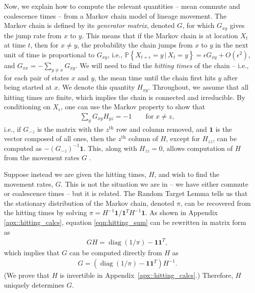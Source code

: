 \documentclass{article}
\DeclareMathOperator{\diag}{\mathop{\mbox{diag}}}
\renewcommand{\P}{\mathbb{P}}
\newcommand{\given}{\,\vert\,}
\newcommand{\PP}[1]{\P\!\left\{#1\right\}}
\newcommand{\bone}{\mathbf{1}}
\begin{document}
Now, we explain how to compute the relevant quantities --
mean commute and coalescence times -- from a Markov chain model of lineage movement.
The Markov chain is defined by its \emph{generator matrix}, denoted $G$,
for which $G_{xy}$ gives the jump rate from $x$ to $y$.
This means that if the Markov chain is at location $X_t$ at time $t$,
then for $x \neq y$, the probability the chain jumps from $x$ to $y$ in the next unit of time
is proportional to $G_{xy}$,
i.e., $\PP{X_{t+\epsilon} = y \given X_t = y} = \epsilon G_{xy} + O(\epsilon^2)$,
and $G_{xx} = - \sum_{y \neq x} G_{xy}$.
We will need to find the \emph{hitting times} of the chain --
i.e., for each pair of states $x$ and $y$, 
the mean time until the chain first hits $y$ after being started at $x$.
We denote this quantity $H_{xy}$.
Throughout, we assume that all hitting times are finite,
which implies the chain is connected and irreducible.
By conditioning on $X_\epsilon$,
one can use the Markov property to show that
\begin{align} \label{eqn:hitting_sum}
    \sum_y G_{xy} H_{yz} = -1 \qquad \text{for} \; x \neq z,
\end{align}
i.e., if $G_{-z}$ is the matrix with the $z^\text{th}$ row and column removed,
and $\bone$ is the vector composed of all ones,
then the $z^\text{th}$ column of $H$, except for $H_{zz}$,
can be computed as $- (G_{-z})^{-1} \bone$.
This, along with $H_{zz} = 0$, allows computation of $H$
from the movement rates $G$ \citep{kemeny1983finite}.

Suppose instead we are given the hitting times, $H$, and wish to find the movement rates, $G$.
This is not the situation we are in -- we have either commute or coalescence times --
but it is related.
The Random Target Lemma \citep{aldous-fill-2014}
tells us that the stationary distribution of the Markov chain, denoted $\pi$,
can be recovered from the hitting times by solving $\pi = H^{-1} \bone / \bone^T H^{-1} \bone$.
As shown in Appendix \ref{apx::hitting_calcs},
equation \eqref{eqn:hitting_sum} can be rewritten in matrix form as
\begin{align}
    G H = \diag(1/\pi) - \bone \bone^T ,
\end{align}
which implies that $G$ can be computed directly from $H$ as
\begin{align} \label{eqn:G_from_H}
    G = \left( \diag(1/\pi) - \bone \bone^T \right) H^{-1} .
\end{align}
(We prove that $H$ is invertible in Appendix~\ref{apx::hitting_calcs}.)
Therefore, $H$ uniquely determines $G$.
\end{document}
